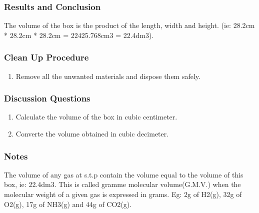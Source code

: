 \subsubsection*{Results and Conclusion}
The volume of the box is the product of the length, width and height. (ie: 28.2cm * 28.2cm * 28.2cm = 22425.768cm3 = 22.4dm3).

\subsubsection*{Clean Up Procedure}
\begin{enumerate}
\item{Remove all the unwanted materials and dispose them safely.}
\end{enumerate}

\subsubsection*{Discussion Questions}
\begin{enumerate}
\item{Calculate the volume of the box in cubic centimeter.}
\item{Converte the volume obtained in cubic decimeter.}
\end{enumerate}

\subsubsection*{Notes}
The volume of any gas at s.t.p contain the volume equal to the volume of this box, ie: 22.4dm3. This is called gramme molecular volume(G.M.V.) when the molecular weight of a given gas is expressed in grams. Eg: 2g of H2(g), 32g of O2(g), 17g of NH3(g) and 44g of CO2(g).
